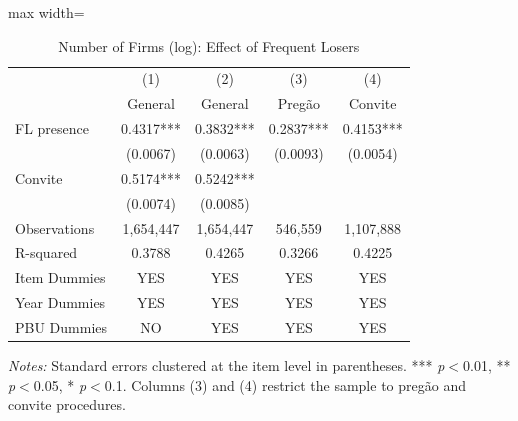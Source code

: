 \begin{table}[htbp]
\centering
\caption{Number of Firms (log): Effect of Frequent Losers}
\label{tab:nfirms}
\begin{adjustbox}{max width=\textwidth}
\begin{threeparttable}
\small
\begin{tabular}{lcccc}
\toprule
 & (1) & (2) & (3) & (4) \\
 & General & General & Preg\~{a}o & Convite \\
\midrule
FL presence & 0.4317*** & 0.3832*** & 0.2837*** & 0.4153*** \\
 & (0.0067) & (0.0063) & (0.0093) & (0.0054) \\
Convite & 0.5174*** & 0.5242*** &  &  \\
 & (0.0074) & (0.0085) &  &  \\
\midrule
Observations & 1,654,447 & 1,654,447 & 546,559 & 1,107,888 \\
R-squared & 0.3788 & 0.4265 & 0.3266 & 0.4225 \\
Item Dummies & YES & YES & YES & YES \\
Year Dummies & YES & YES & YES & YES \\
PBU Dummies & NO & YES & YES & YES \\
\bottomrule
\end{tabular}
\begin{tablenotes}
\small
\item \textit{Notes:} Standard errors clustered at the item level in parentheses. *** \textit{p}$<$0.01, ** \textit{p}$<$0.05, * \textit{p}$<$0.1. Columns (3) and (4) restrict the sample to preg\~{a}o and convite procedures.
\end{tablenotes}
\end{threeparttable}
\end{adjustbox}
\end{table}
